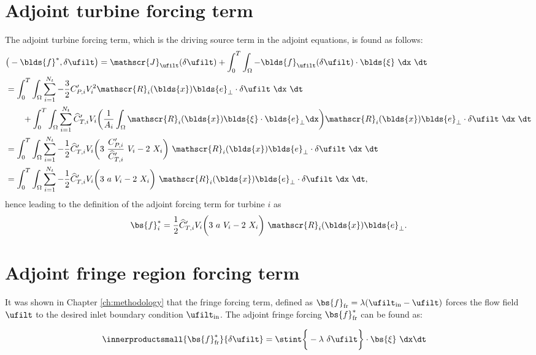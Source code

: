 \section{Adjoint turbine forcing term}
The adjoint turbine forcing term, which is the driving source term in the adjoint equations, is found as follows:
\begin{align}
&\big( -\blds{f}^*, \delta \ufilt \big) = \mathscr{J}_{\ufilt} (\delta \ufilt) + \int_{0}^{T} \int_\Omega -\blds{f}_{\ufilt} (\delta \ufilt) \cdot \blds{\xi}~\dx~\dt\\
&= \int_{0}^{T} \int_{\Omega} \sum_{i=1}^{N_t} -\frac{3}{2} C_{P,i}' V_{i}^2 \mathscr{R}_i (\blds{x}) \blds{e}_\perp \cdot \delta \ufilt~\dx~\dt \nonumber \\
& \qquad + \int_{0}^{T} \int_{\Omega} \sum_{i=1}^{N_t} \widehat{C}_{T,i}' V_{i} \bigg( \frac{1}{A_i} \int_{\Omega} \mathscr{R}_i(\blds{x}) \blds{\xi} \cdot \blds{e}_\perp \dx  \bigg) \mathscr{R}_i (\blds{x}) \blds{e}_\perp \cdot \delta \ufilt ~\dx~\dt\\
&= \int_{0}^{T} \int_{\Omega} \sum_{i=1}^{N_t} -\frac{1}{2} \widehat{C}_{T,i}' V_{i} \bigg(3~\frac{C_{P,i}'}{\widehat{C}_{T,i}'}~V_{i} - 2~X_{i} \bigg)~\mathscr{R}_i (\blds{x}) \blds{e}_\perp \cdot \delta \ufilt ~\dx~\dt\\
&= \int_{0}^{T} \int_{\Omega} \sum_{i=1}^{N_t} -\frac{1}{2} \widehat{C}_{T,i}' V_{i} \bigg(3~a~V_{i} - 2~X_{i} \bigg)~\mathscr{R}_i (\blds{x}) \blds{e}_\perp \cdot \delta \ufilt ~\dx~\dt,
\end{align}
hence leading to the definition of the adjoint forcing term for turbine $i$ as 
\begin{equation}
	\bs{f}_i^* = \frac{1}{2} \widehat{C}_{T,i}' V_{i} \bigg(3~a~V_{i} - 2~X_{i} \bigg)~\mathscr{R}_i (\blds{x}) \blds{e}_\perp.
\end{equation}

\section{Adjoint fringe region forcing term}
It was shown in Chapter \ref{ch:methodology} that the fringe forcing term, defined as $\bs{f}_{\text{fr}} = \lambda (\ufilt_{\text{in}} - \ufilt)$ forces the flow field $\ufilt$ to the desired inlet boundary condition $\ufilt_{\text{in}}$. The adjoint fringe forcing $\bs{f}_{\text{fr}}^*$ can be found as:

\begin{align}
	\innerproductsmall{\bs{f}_{\text{fr}}^*}{\delta \ufilt} &= \stint \bigg\{ -\lambda \ \delta \ufilt\bigg\}\cdot \bs{\xi}~ \dx \dt
\end{align}

